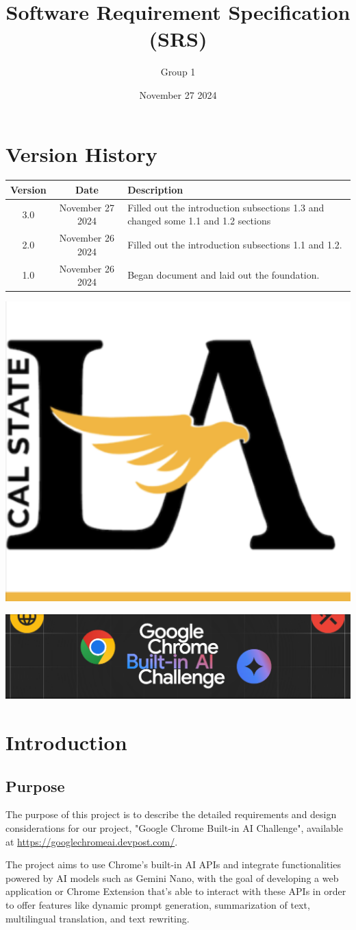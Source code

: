 \documentclass{article}
\title{Software Requirement Specification (SRS)}
\author{Group 1 }
\date{November 27 2024}
\begin{document}
\maketitle  
\pagebreak

\tableofcontents
\pagebreak

\section*{Version History}
\begin{longtable}{|c|c|p{10cm}|}
\hline
\textbf{Version} & \textbf{Date} & \textbf{Description} \\ \hline
3.0 & November 27 2024 & Filled out the introduction subsections 1.3 and changed some 1.1 and 1.2 sections \\ \hline
2.0 & November 26 2024 & Filled out the introduction subsections 1.1 and 1.2.  \\ \hline
1.0 & November 26 2024 & Began document and laid out the foundation.  \\ \hline
\end{longtable}
\pagebreak

\includegraphics[width=0.3\linewidth]{../logo/csula.png} 

\includegraphics[width=0.3\linewidth]{../logo/chromeai.png} 

\section{Introduction}
\subsection{Purpose}
The purpose of this project is to describe the detailed requirements and design considerations for our project, "Google Chrome Built-in AI Challenge", available at \url{https://googlechromeai.devpost.com/}.

The project aims to use Chrome's built-in AI APIs and integrate functionalities powered by AI models such as Gemini Nano, with the goal of developing a web application or Chrome Extension that's able to interact with these APIs in order to offer features like dynamic prompt generation, summarization of text, multilingual translation, and text rewriting.
\end{document}
